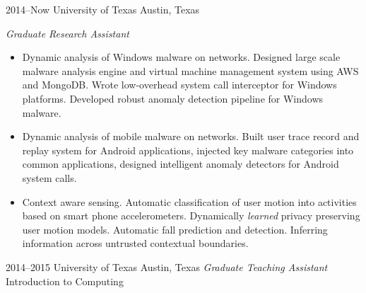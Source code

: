 \documentclass[]{friggeri-cv} %
\begin{document}
\begin{entrylist}


\entry
{2014--Now}
{University of Texas}
{Austin, Texas}
{\emph{Graduate Research Assistant} \\
\begin{itemize}
\item Dynamic analysis of Windows malware on networks. Designed large scale malware analysis engine and virtual machine management system using AWS and MongoDB. Wrote low-overhead system call interceptor for Windows platforms. Developed robust anomaly detection pipeline for Windows malware.
\item Dynamic analysis of mobile malware on networks. Built user trace record and replay system for Android applications, injected key malware categories into common applications, designed intelligent anomaly detectors for Android system calls.
\item Context aware sensing. Automatic classification of user motion into activities based on smart phone accelerometers. Dynamically \textit{learned} privacy preserving user motion models. Automatic fall prediction and detection. Inferring information across untrusted contextual boundaries. 
\end{itemize} }

\entry
{2014--2015}
{University of Texas}
{Austin, Texas}
{\emph{Graduate Teaching Assistant} \\
Introduction to Computing }



\end{entrylist}
\end{document}
